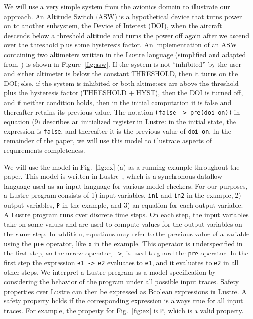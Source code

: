 We will use a very simple system from the avionics domain to illustrate our approach. An Altitude Switch (ASW) is a hypothetical device that turns power on to another subsystem, the Device of Interest (DOI), when the aircraft descends below a threshold altitude and turns the power off again after we ascend over the threshold plus some hysteresis factor.  An implementation of an ASW containing two altimeters written in the Lustre language (simplified and adapted from~\cite{HCW02:ase-deviation}) is shown in Figure~\ref{fig:asw}.  If the system is not ``inhibited'' by the user and either altimeter is below the constant THRESHOLD, then it turns on the DOI; else, if the system is inhibited or both altimeters are above the threshold plus the hysteresis factor (THRESHOLD + HYST), then the DOI is turned off, and if neither condition holds, then in the initial computation it is false and thereafter retains its previous value.  The notation \texttt{(false -> pre(doi\_on))} in equation (9) describes an initialized register in Lustre: in the initial state, the expression is \texttt{false}, and thereafter it is the previous value of \texttt{doi\_on}.  In the remainder of the paper, we will use this model to illustrate aspects of requirements completeness.  %


\iffalse
{}

We will use the model in Fig.~\ref{fig:ex} (a) as
a running example throughout the paper. This model is written in Lustre~\cite{Halbwachs91:lustre}, which is a synchronous dataflow language used as an input language for various model checkers. For our purposes, a Lustre program
consists of 1) input variables, {\tt in1} and {\tt in2} in the example, 2) output
variables, {\tt P} in the example, and 3) an
equation for each output variable. A Lustre program runs over discrete
time steps. On each step, the input variables take on some values and
are used to compute values for the output variables on the same step.
In addition, equations may refer to the previous value of a variable
using the {\tt pre} operator, like {\tt x} in the example. This operator is underspecified in the
first step, so the arrow operator, {\tt ->}, is used to guard the
{\tt pre} operator. In the first step the expression {\tt e1 -> e2}
evaluates to {\tt e1}, and it evaluates to {\tt e2} in all other steps. We interpret a Lustre program as a model specification by considering
the behavior of the program under all possible input traces. Safety
properties over Lustre can then be expressed as Boolean expressions in
Lustre. A safety property holds if the corresponding expression is
always true for all input traces. For example, the property for
Fig.~\ref{fig:ex} is {\tt P}, which is a valid property.

